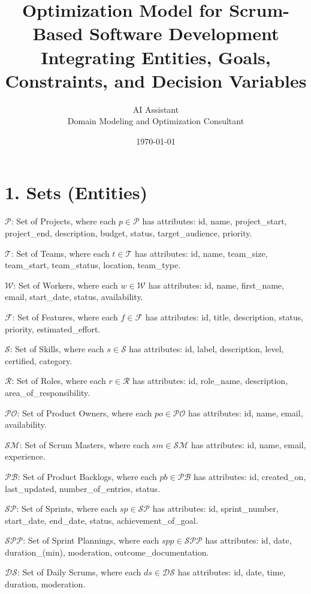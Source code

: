 \documentclass[11pt]{article}
\title{\Huge Optimization Model for Scrum-Based Software Development \\ \Large Integrating Entities, Goals, Constraints, and Decision Variables}
\author{\Large AI Assistant \\ Domain Modeling and Optimization Consultant}
\date{\today}
\begin{document}
\maketitle
\tableofcontents
\newpage

\section{1. Sets (Entities)}
\item $\mathcal{P}$: Set of Projects, where each $p \in \mathcal{P}$ has attributes: id, name, project\_start, project\_end, description, budget, status, target\_audience, priority.
    \item $\mathcal{T}$: Set of Teams, where each $t \in \mathcal{T}$ has attributes: id, name, team\_size, team\_start, team\_status, location, team\_type.
    \item $\mathcal{W}$: Set of Workers, where each $w \in \mathcal{W}$ has attributes: id, name, first\_name, email, start\_date, status, availability.
    \item $\mathcal{F}$: Set of Features, where each $f \in \mathcal{F}$ has attributes: id, title, description, status, priority, estimated\_effort.
    \item $\mathcal{S}$: Set of Skills, where each $s \in \mathcal{S}$ has attributes: id, label, description, level, certified, category.
    \item $\mathcal{R}$: Set of Roles, where each $r \in \mathcal{R}$ has attributes: id, role\_name, description, area\_of\_responsibility.
    \item $\mathcal{PO}$: Set of Product Owners, where each $po \in \mathcal{PO}$ has attributes: id, name, email, availability.
    \item $\mathcal{SM}$: Set of Scrum Masters, where each $sm \in \mathcal{SM}$ has attributes: id, name, email, experience.
    \item $\mathcal{PB}$: Set of Product Backlogs, where each $pb \in \mathcal{PB}$ has attributes: id, created\_on, last\_updated, number\_of\_entries, status.
    \item $\mathcal{SP}$: Set of Sprints, where each $sp \in \mathcal{SP}$ has attributes: id, sprint\_number, start\_date, end\_date, status, achievement\_of\_goal.
    \item $\mathcal{SPP}$: Set of Sprint Plannings, where each $spp \in \mathcal{SPP}$ has attributes: id, date, duration\_(min), moderation, outcome\_documentation.
    \item $\mathcal{DS}$: Set of Daily Scrums, where each $ds \in \mathcal{DS}$ has attributes: id, date, time, duration, moderation.
\end{document}
